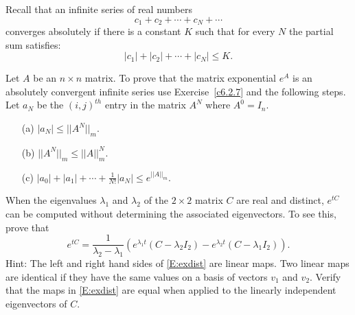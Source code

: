 \documentclass{ximera}
\begin{document}
\begin{exercise} \label{c6.2.8}
Recall that an infinite series of real numbers
\[
c_1+c_2 +\cdots+c_N + \cdots
\]
converges absolutely if there is a constant $K$ such that for every $N$
the partial sum satisfies:
\[
|c_1| + |c_2| + \cdots + |c_N| \leq K.
\]

Let $A$ be an $n\times n$ matrix.  To prove that the matrix exponential $e^A$
is an absolutely convergent infinite series use Exercise~\ref{c6.2.7} and the
following steps.  Let $a_N$ be the $(i,j)^{th}$ entry in the matrix $A^N$
where $A^0=I_n$.
\begin{itemize}
\item[(a)]  $|a_N| \leq ||A^N||_m$.
\item[(b)]  $||A^N||_m \leq ||A||_m^N$.
\item[(c)]  $|a_0| + |a_1| + \cdots + \frac{1}{N!}|a_N| \leq e^{||A||_m}$.
\end{itemize}
\end{exercise}

\AEXER
\begin{exercise} \label{c6.3.14}
When the eigenvalues $\lambda_1$ and $\lambda_2$ of the $2\times 2$ 
matrix $C$ are real and distinct, $e^{tC}$ can be computed without determining 
the associated eigenvectors.  To see this, prove that
\begin{equation}  \label{E:exdist}
e^{tC} = \frac{1}{\lambda_2-\lambda_1}\left(e^{\lambda_1 t}(C-\lambda_2I_2) -
e^{\lambda_2 t}(C-\lambda_1I_2)\right).
\end{equation}
Hint:  The left and right hand sides of \eqref{E:exdist} are linear maps.  Two 
linear maps are identical if they have the same values on a basis of vectors 
$v_1$ and $v_2$.  Verify that the maps in \eqref{E:exdist} are equal when 
applied to the linearly independent eigenvectors of $C$.
\end{exercise}
\end{document}
